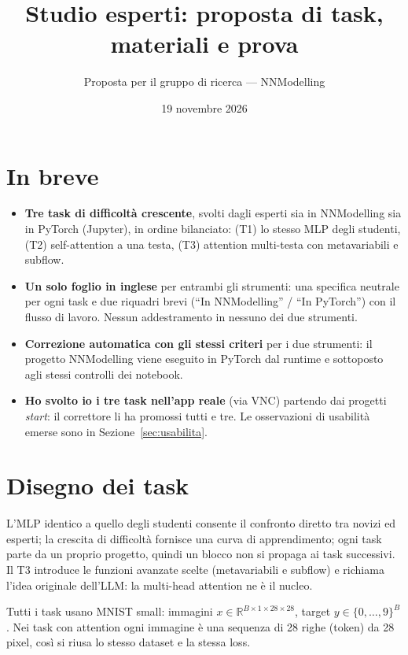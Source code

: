 \documentclass[10pt,a4paper]{article}
\title{\color{accent}Studio esperti: proposta di task, materiali e prova}
\author{Proposta per il gruppo di ricerca --- NNModelling}
\date{19 novembre 2026}
\begin{document}
\maketitle

\section*{In breve}

\begin{itemize}
    \item \textbf{Tre task di difficoltà crescente}, svolti dagli esperti sia in
    NNModelling sia in PyTorch (Jupyter), in ordine bilanciato:
    (T1) lo stesso MLP degli studenti, (T2) self-attention a una testa,
    (T3) attention multi-testa con metavariabili e subflow.
    \item \textbf{Un solo foglio in inglese} per entrambi gli strumenti: una specifica
    neutrale per ogni task e due riquadri brevi (``In NNModelling'' / ``In PyTorch'')
    con il flusso di lavoro. Nessun addestramento in nessuno dei due strumenti.
    \item \textbf{Correzione automatica con gli stessi criteri} per i due strumenti:
    il progetto NNModelling viene eseguito in PyTorch dal runtime e sottoposto agli
    stessi controlli dei notebook.
    \item \textbf{Ho svolto io i tre task nell'app reale} (via VNC) partendo dai
    progetti \emph{start}: il correttore li ha promossi tutti e tre. Le osservazioni
    di usabilità emerse sono in Sezione~\ref{sec:usabilita}.
\end{itemize}

\section{Disegno dei task}

L'MLP identico a quello degli studenti consente il confronto diretto tra novizi ed
esperti; la crescita di difficoltà fornisce una curva di apprendimento; ogni task
parte da un proprio progetto, quindi un blocco non si propaga ai task successivi.
Il T3 introduce le funzioni avanzate scelte (metavariabili e subflow) e richiama
l'idea originale dell'LLM: la multi-head attention ne è il nucleo.

Tutti i task usano MNIST small: immagini \(x\in\mathbb{R}^{B\times1\times28\times28}\),
target \(y\in\{0,\dots,9\}^B\). Nei task con attention ogni immagine è una sequenza
di 28 righe (token) da 28 pixel, così si riusa lo stesso dataset e la stessa loss.
\end{document}
